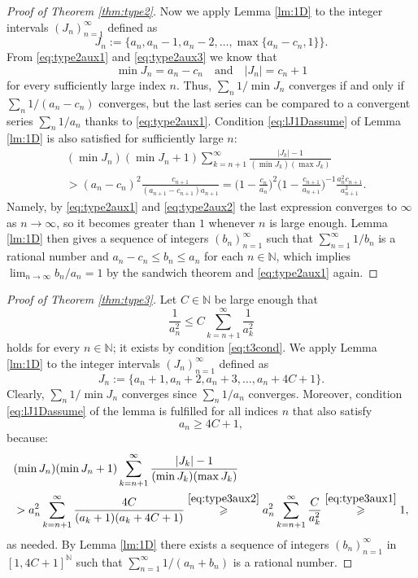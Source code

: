 \documentclass[11pt,letterpaper,reqno]{amsart}
\numberwithin{equation}{section}
\theoremstyle{definition}
\numberwithin{equation}{section}
\begin{document}
\begin{proof}[Proof of Theorem \ref{thm:type2}]
Now we apply Lemma \ref{lm:1D} to the integer intervals $(J_n)_{n=1}^{\infty}$ defined as
\[ J_n := \big\{ a_n, a_n-1, a_n-2, \ldots, \max\{a_n-c_n, 1\} \big\}. \]
From \eqref{eq:type2aux1} and \eqref{eq:type2aux3} we know that
\[ \min J_n = a_n-c_n \quad\text{and}\quad |J_n|=c_n+1 \]
for every sufficiently large index $n$.
Thus, $\sum_n 1/\min J_n$ converges if and only if $\sum_n 1/(a_n-c_n)$ converges, but the last series can be compared to a convergent series $\sum_n 1/a_n$ thanks to \eqref{eq:type2aux1}.
Condition \eqref{eq:lJ1Dassume} of Lemma \ref{lm:1D} is also satisfied for sufficiently large $n$:
\begin{align*}
& (\min J_n)(\min J_n+1) \sum_{k=n+1}^{\infty} \frac{|J_k|-1}{(\min J_k)(\max J_k)} \\
& > (a_n-c_n)^2 \frac{c_{n+1}}{(a_{n+1}-c_{n+1})a_{n+1}}
= \Big(1 - \frac{c_n}{a_n}\Big)^2 \Big(1 - \frac{c_{n+1}}{a_{n+1}}\Big)^{-1} \frac{a_{n}^2 c_{n+1}}{a_{n+1}^2} .
\end{align*}
Namely, by \eqref{eq:type2aux1} and \eqref{eq:type2aux2} the last expression converges to $\infty$ as $n\to\infty$, so it becomes greater than $1$ whenever $n$ is large enough.
Lemma \ref{lm:1D} then gives a sequence of integers $(b_n)_{n=1}^{\infty}$ such that $\sum_{n=1}^{\infty} 1/b_n$ is a rational number and $a_n-c_n\leqslant b_n\leqslant a_n$ for each $n\in\mathbb{N}$, which implies $\lim_{n\to\infty} b_n/a_n=1$ by  the sandwich theorem and \eqref{eq:type2aux1} again.
\end{proof}

\begin{proof}[Proof of Theorem \ref{thm:type3}]
Let $C\in\mathbb{N}$ be large enough that
\begin{equation}\label{eq:type3aux1}
\frac{1}{a_n^2} \leqslant C \sum_{k=n+1}^{\infty} \frac{1}{a_k^2}
\end{equation}
holds for every $n\in\mathbb{N}$; it exists by condition \eqref{eq:t3cond}.
We apply Lemma \ref{lm:1D} to the integer intervals $(J_n)_{n=1}^{\infty}$ defined as
\[ J_n := \big\{ a_n+1, a_n+2, a_n+3, \ldots, a_n+4C+1 \big\}. \]
Clearly, $\sum_n 1/\min J_n$ converges since $\sum_n 1/a_n$ converges.
Moreover, condition \eqref{eq:lJ1Dassume} of the lemma is fulfilled for all indices $n$ that also satisfy
\begin{equation}\label{eq:type3aux2}
a_n\geqslant 4C+1,
\end{equation}
because:
\begin{align*}
& (\min J_n)(\min J_n+1) \sum_{k=n+1}^{\infty} \frac{|J_k|-1}{(\min J_k)(\max J_k)} \\
& > a_n^2 \sum_{k=n+1}^{\infty} \frac{4C}{(a_k+1)(a_k+4C+1)}
\stackrel{\eqref{eq:type3aux2}}{\geqslant} a_n^2 \sum_{k=n+1}^{\infty} \frac{C}{a_k^2} \stackrel{\eqref{eq:type3aux1}}{\geqslant} 1,
\end{align*}
as needed.
By Lemma \ref{lm:1D} there exists a sequence of integers $(b_n)_{n=1}^{\infty}$ in $[1,4C+1]^\mathbb{N}$ such that $\sum_{n=1}^{\infty} 1/(a_n+b_n)$ is a rational number.
\end{proof}
\end{document}
